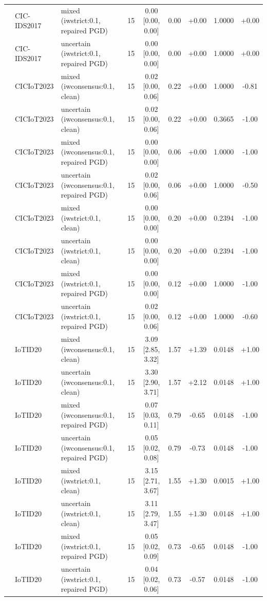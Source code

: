 \begin{table}[t]
\begin{tabular}{lllcccccc}
 & CIC-IDS2017 & mixed (iwstrict:0.1, repaired PGD) & 15 & 0.00 [0.00, 0.00] & 0.00 & +0.00 & 1.0000 & +0.00 \\
 & CIC-IDS2017 & uncertain (iwstrict:0.1, repaired PGD) & 15 & 0.00 [0.00, 0.00] & 0.00 & +0.00 & 1.0000 & +0.00 \\
 & CICIoT2023 & mixed (iwconsensus:0.1, clean) & 15 & 0.02 [0.00, 0.06] & 0.22 & +0.00 & 1.0000 & -0.81 \\
 & CICIoT2023 & uncertain (iwconsensus:0.1, clean) & 15 & 0.02 [0.00, 0.06] & 0.22 & +0.00 & 0.3665 & -1.00 \\
 & CICIoT2023 & mixed (iwconsensus:0.1, repaired PGD) & 15 & 0.00 [0.00, 0.00] & 0.06 & +0.00 & 1.0000 & -1.00 \\
 & CICIoT2023 & uncertain (iwconsensus:0.1, repaired PGD) & 15 & 0.02 [0.00, 0.06] & 0.06 & +0.00 & 1.0000 & -0.50 \\
 & CICIoT2023 & mixed (iwstrict:0.1, clean) & 15 & 0.00 [0.00, 0.00] & 0.20 & +0.00 & 0.2394 & -1.00 \\
 & CICIoT2023 & uncertain (iwstrict:0.1, clean) & 15 & 0.00 [0.00, 0.00] & 0.20 & +0.00 & 0.2394 & -1.00 \\
 & CICIoT2023 & mixed (iwstrict:0.1, repaired PGD) & 15 & 0.00 [0.00, 0.00] & 0.12 & +0.00 & 1.0000 & -1.00 \\
 & CICIoT2023 & uncertain (iwstrict:0.1, repaired PGD) & 15 & 0.02 [0.00, 0.06] & 0.12 & +0.00 & 1.0000 & -0.60 \\
 & IoTID20 & mixed (iwconsensus:0.1, clean) & 15 & 3.09 [2.85, 3.32] & 1.57 & +1.39 & 0.0148 & +1.00 \\
 & IoTID20 & uncertain (iwconsensus:0.1, clean) & 15 & 3.30 [2.90, 3.71] & 1.57 & +2.12 & 0.0148 & +1.00 \\
 & IoTID20 & mixed (iwconsensus:0.1, repaired PGD) & 15 & 0.07 [0.03, 0.11] & 0.79 & -0.65 & 0.0148 & -1.00 \\
 & IoTID20 & uncertain (iwconsensus:0.1, repaired PGD) & 15 & 0.05 [0.02, 0.08] & 0.79 & -0.73 & 0.0148 & -1.00 \\
 & IoTID20 & mixed (iwstrict:0.1, clean) & 15 & 3.15 [2.71, 3.67] & 1.55 & +1.30 & 0.0015 & +1.00 \\
 & IoTID20 & uncertain (iwstrict:0.1, clean) & 15 & 3.11 [2.79, 3.47] & 1.55 & +1.30 & 0.0148 & +1.00 \\
 & IoTID20 & mixed (iwstrict:0.1, repaired PGD) & 15 & 0.05 [0.02, 0.09] & 0.73 & -0.65 & 0.0148 & -1.00 \\
 & IoTID20 & uncertain (iwstrict:0.1, repaired PGD) & 15 & 0.04 [0.02, 0.06] & 0.73 & -0.57 & 0.0148 & -1.00 \\

\end{tabular}
\end{table}
